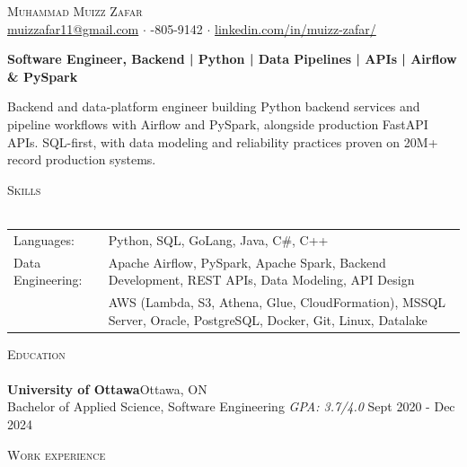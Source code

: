 \documentclass[a4paper]{article}
\newcommand{\lineunder} {
    \vspace*{-8pt} \\
    \hspace*{-18pt} \hrulefill \\
}
\newcommand{\header} [1] {
    {\hspace*{-18pt}\vspace*{6pt} \textsc{#1}}
    \vspace*{-6pt} \lineunder
}
\begin{document}
\vspace*{-40pt}

\vspace*{-10pt}
\begin{center}
	{\Huge \scshape {Muhammad Muizz Zafar}}\\
	\faSend \space \href{mailto:muizzafar11@gmail.com}{muizzafar11@gmail.com} $\cdot$ \faPhoneSquare {}-805-9142 $\cdot$ \faLinkedinSquare \space \href{https://www.linkedin.com/in/muizz-zafar/}{linkedin.com/in/muizz-zafar/}
	\\
\end{center}

\vspace{-5pt}
\begin{center}
\textbf{Software Engineer, Backend | Python | Data Pipelines | APIs | Airflow \& PySpark}
\end{center}
\begin{center}
Backend and data-platform engineer building Python backend services and pipeline workflows with Airflow and PySpark, alongside production FastAPI APIs. SQL-first, with data modeling and reliability practices proven on 20M+ record production systems.
\end{center}

\header{Skills}
\begin{tabular}{ l l }
	Languages: 
& Python, SQL, GoLang, Java, C\#, C++ \\

Data Engineering: 
& Apache Airflow, PySpark, Apache Spark, Backend Development, REST APIs, Data Modeling, API Design\\
& AWS (Lambda, S3, Athena, Glue, CloudFormation), MSSQL Server, Oracle, PostgreSQL, Docker, Git, Linux, Datalake

\end{tabular}

\header{Education}
\textbf{University of Ottawa}\hfill Ottawa, ON\\
Bachelor of Applied Science, Software Engineering \textit{GPA: 3.7/4.0} \hfill Sept 2020 - Dec 2024\\
\vspace{2mm}

\header{Work experience}
\vspace{1.5mm}
\end{document}
